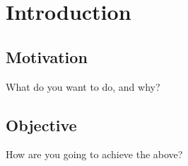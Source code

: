 
\section{Introduction}\label{chapt:introduction}


\subsection{Motivation}\label{sec:motivation}
What do you want to do, and why?


\subsection{Objective}\label{sec:objective}
How are you going to achieve the above?